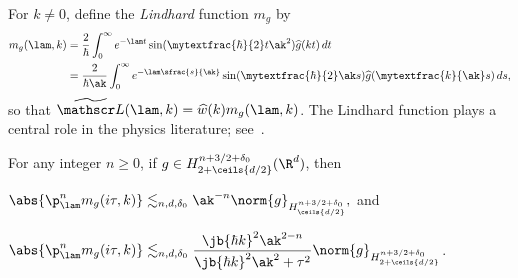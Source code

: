 For $k\neq0$, define the \textit{Lindhard} function $m_g$ by\vspace*{-3pt}
\begin{align}\begin{split}
m_g(\lam,k)&=\frac{2}{\hbar}\int_0^\infty e^{-\lam t}\sin( \mytextfrac{\hbar}{2} t\ak^2)\widehat g(kt)\,dt\\
&=\frac{2}{
\hbar\ak}\int_0^\infty e^{-\lam \sfrac{s}{\ak}}\sin(\mytextfrac{\hbar}{2}\ak s)\widehat g(\mytextfrac{k}{\ak}s)\,ds,\end{split}\label{mf}
\end{align}so that $\widetilde {\mathscr L}(\lam,k)=\widehat w(k)m_g(\lam,k)$. The Lindhard function plays a central role in the physics literature; see~\cite{LewinSabinII2014}.

\begin{lemma}\label{mflemma}For any integer $n\geq0$, if $g\in{H^{n+3/2+\delta_0}_{2+\ceils{d/2}}}(\R^d)$, then
\begin{enumeratei}
\item $\abs{\p_\lam^nm_g(i\tau,k)}\lesssim_{n,d,\delta_0}\ak^{-n}\norm{g}_{H^{n+3/2+\delta_0}_{\ceils{d/2}}},$ and\label{mf1}
\item $\abs{\p_\lam^nm_g(i\tau,k)}\lesssim_{n,d,\delta_0}\dfrac{\jb{\hbar k}^2\ak^{2-n}}{\jb{\hbar k}^2\ak^2+\tau^2}\norm{g}_{H^{n+3/2+\delta_0}_{2+\ceils{d/2}}}$.\label{mf2}
\end{enumeratei}
\end{lemma}
